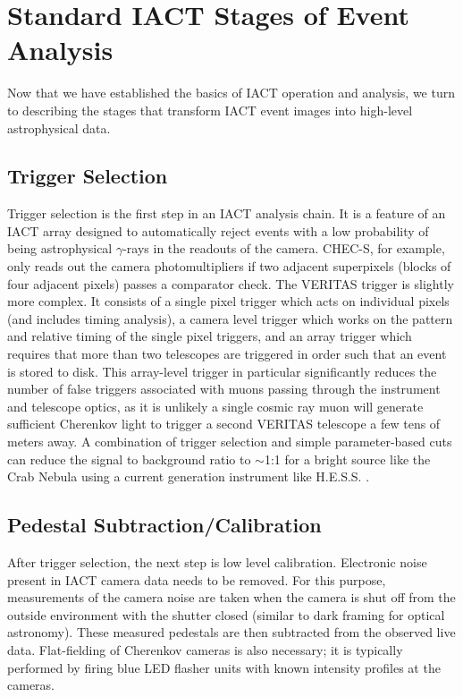 \section{Standard IACT Stages of Event Analysis}\label{app:imaging}
Now that we have established the basics of IACT operation and analysis, we turn to describing the stages that transform IACT event images into high-level astrophysical data.
\subsection{Trigger Selection}

Trigger selection is the first step in an IACT analysis chain. It is a feature of an IACT array designed to automatically reject events with a low probability of being astrophysical $\gamma$-rays in the readouts of the camera. CHEC-S, for example, only reads out the camera photomultipliers if two adjacent superpixels (blocks of four adjacent pixels) passes a comparator check. The VERITAS trigger is slightly more complex. It consists of a single pixel trigger which acts on individual pixels (and includes timing analysis), a camera level trigger which works on the pattern and relative timing of the single pixel triggers, and an array trigger which requires that more than two telescopes are triggered in order such that an event is stored to disk\cite{veritastrigger}. This array-level trigger in particular significantly reduces the number of false triggers associated with muons passing through the instrument and telescope optics, as it is unlikely a single cosmic ray muon will generate sufficient Cherenkov light to trigger a second VERITAS telescope a few tens of meters away. A combination of trigger selection and simple parameter-based cuts can reduce the signal to background ratio to $\sim$1:1 for a bright source like the Crab Nebula using a current generation instrument like H.E.S.S. \cite{Berge07}.

\subsection{Pedestal Subtraction/Calibration}

After trigger selection, the next step is low level calibration. Electronic noise present in IACT camera data needs to be removed. For this purpose, measurements of the camera noise are taken when the camera is shut off from the outside environment with the shutter closed (similar to dark framing for optical astronomy). These measured pedestals are then subtracted from the observed live data. Flat-fielding of Cherenkov cameras is also necessary; it is typically performed by firing blue LED flasher units with known intensity profiles at the cameras.

